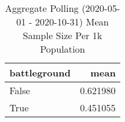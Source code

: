 \begin{table}
\centering
\caption{Aggregate Polling (2020-05-01 - 2020-10-31) Mean Sample Size Per 1k Population}
\label{table:aggregate\_polling\_2020-05-01\_-\_2020-10-31\_mean\_sample\_size\_per\_1k\_population}
\begin{tabular}{lr}
\toprule
 battleground &      mean \\
\midrule
        False &  0.621980 \\
         True &  0.451055 \\
\bottomrule
\end{tabular}
\end{table}
